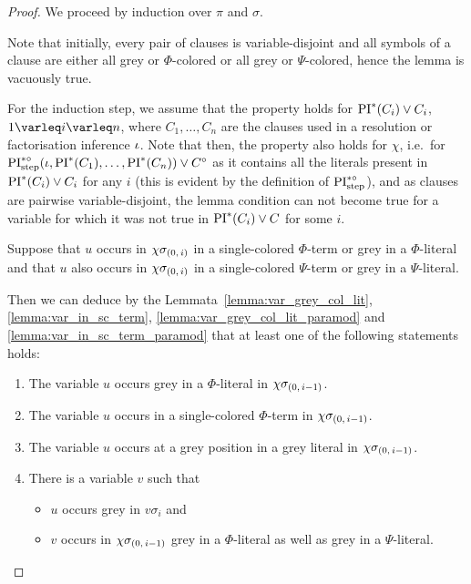 \documentclass[,%
	draft=false,%
	numbers=noendperiod
	12pt,
	a4paper,
	oneside,%
	openany,
]{memoir}
\newcommand{\inv}{\ensuremath{\chi}}
\begin{document}
\begin{proof}
	We proceed by induction over $\pi$ and $\sigma$. 

	Note that initially, every pair of clauses is variable-disjoint and all symbols of a clause are either all grey or $\Phi$-colored or all grey or $\Psi$-colored, hence the lemma is vacuously true.

	For the induction step,
	we assume that the property holds for $\operatorname{PI}^*(C_i) \lor C_i$, $1\varleq i \varleq n$, where $C_1, \dots, C_n$ are the clauses used in a resolution or factorisation inference $\iota$.
	Note that then, the property also holds for $\inv$, i.e.\ for $\operatorname{PI}^{*\circ}_{\mathrm{step}}(\iota, \operatorname{PI}^*(C_1), \dots, \operatorname{PI}^*(C_n)) \lor C^\circ$
	as it contains all the literals present in $\operatorname{PI}^*(C_i) \lor C_i$ for any $i$ (this is evident by the definition of $\operatorname{PI}^{*\circ}_{\mathrm{step}}$), and as clauses are pairwise variable-disjoint, the lemma condition can not become true for a variable for which it was not true in $\operatorname{PI}^*(C_i)\lor C$ for some $i$.


	Suppose that $u$ occurs in $\chi\sigma_{(0,\,i)}$ in a single-colored $\Phi$-term or grey in a $\Phi$-literal and 
	that $u$ also occurs in $\chi\sigma_{(0,\,i)}$ in a single-colored $\Psi$-term or grey in a $\Psi$-literal.

	Then we can deduce by the Lemmata~\ref{lemma:var_grey_col_lit}, \ref{lemma:var_in_sc_term}, \ref{lemma:var_grey_col_lit_paramod} and \ref{lemma:var_in_sc_term_paramod} that at least one of the following statements holds:
	\begin{enumerate}
		\item
			\label{oozoh7Oh1}
			The variable $u$ occurs grey in a $\Phi$-literal in $\inv\sigmazmi$.

		\item
			\label{oozoh7Oh5}
			The variable $u$ occurs in a single-colored $\Phi$-term in $\inv\sigmazmi$.

		\item
			\label{oozoh7Oh4}
			The variable $u$ occurs at a grey position in a grey literal in $\inv\sigmazmi$.

		\item 
			\label{oozoh7Oh2}
			There is a variable $v$ such that 
			{
				\renewcommand{\labelitemi}{\textendash}
				\begin{itemize}
					\item $u$ occurs grey in $v\sigma_i$ and
					\item $v$ occurs in $\inv\sigmazmi$ grey in a $\Phi$-literal as well as grey in a $\Psi$-literal.
				\end{itemize}
			}


\end{enumerate}
\end{proof}
\end{document}
